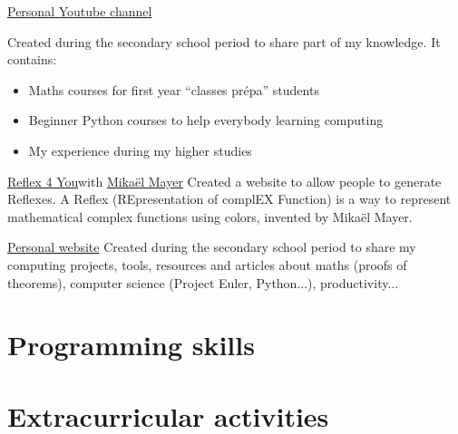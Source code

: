\documentclass[colorlinks,linkcolor=true]{moderncv}
\begin{document}
{\href{https://www.youtube.com/user/lulu303030}{Personal Youtube channel}}{}{}{}
{Created during the secondary school period to share part of my knowledge. It contains:
\begin{itemize}
\item Maths courses for first year ``classes prépa'' students
\item Beginner Python courses to help everybody learning computing
\item My experience during my higher studies
\end{itemize}
}

{\href{http://www.reflex4you.com/}{Reflex 4 You}}{with \href{https://www.linkedin.com/in/mikaelmayer/}{Mikaël Mayer}}{}{}
{Created a website to allow people to generate Reflexes. A Reflex (REpresentation of complEX Function) is a way to represent mathematical complex functions using colors, invented by Mikaël Mayer.}

{\href{https://www.lucaswillems.com/fr}{Personal website}}{}{}{}
{Created during the secondary school period to share my computing projects, tools, resources and  articles about maths (proofs of theorems), computer science (Project Euler, Python...), productivity...}

\section{Programming skills}


\section{Extracurricular activities}

\end{document}
